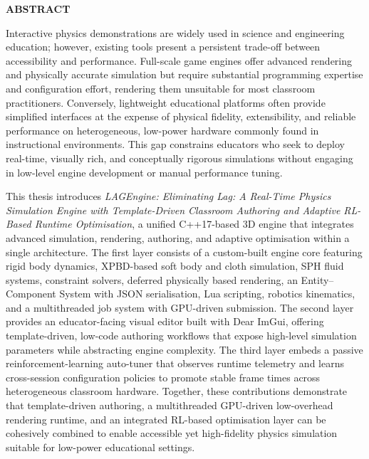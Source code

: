 \documentclass[9pt,openany]{extbook}
\begin{document}
\clearpage
\setcounter{page}{2}

\begin{center}
\textbf{ABSTRACT}
\end{center}

\vspace{1em}

Interactive physics demonstrations are widely used in science and engineering education; however, existing tools present a persistent trade-off between accessibility and performance. Full-scale game engines offer advanced rendering and physically accurate simulation but require substantial programming expertise and configuration effort, rendering them unsuitable for most classroom practitioners. Conversely, lightweight educational platforms often provide simplified interfaces at the expense of physical fidelity, extensibility, and reliable performance on heterogeneous, low-power hardware commonly found in instructional environments. This gap constrains educators who seek to deploy real-time, visually rich, and conceptually rigorous simulations without engaging in low-level engine development or manual performance tuning.

This thesis introduces \textit{LAGEngine: Eliminating Lag: A Real-Time Physics Simulation Engine with Template-Driven Classroom Authoring and Adaptive RL-Based Runtime Optimisation}, a unified C++17-based 3D engine that integrates advanced simulation, rendering, authoring, and adaptive optimisation within a single architecture. The first layer consists of a custom-built engine core featuring rigid body dynamics, XPBD-based soft body and cloth simulation, SPH fluid systems, constraint solvers, deferred physically based rendering, an Entity--Component System with JSON serialisation, Lua scripting, robotics kinematics, and a multithreaded job system with GPU-driven submission. The second layer provides an educator-facing visual editor built with Dear ImGui, offering template-driven, low-code authoring workflows that expose high-level simulation parameters while abstracting engine complexity. The third layer embeds a passive reinforcement-learning auto-tuner that observes runtime telemetry and learns cross-session configuration policies to promote stable frame times across heterogeneous classroom hardware. Together, these contributions demonstrate that template-driven authoring, a multithreaded GPU-driven low-overhead rendering runtime, and an integrated RL-based optimisation layer can be cohesively combined to enable accessible yet high-fidelity physics simulation suitable for low-power educational settings.
\end{document}
